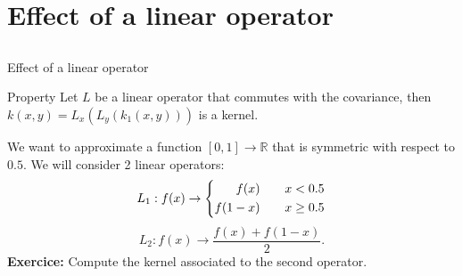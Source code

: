 \section[Linear operator]{Effect of a linear operator}
\subsection{}

\begin{frame}{Effect of a linear operator}
\begin{block}{Property}
Let $L$ be a linear operator that commutes with the covariance, then
$k(x,y) = L_x(L_y(k_1(x,y)))$ is a kernel.
\end{block}
\begin{example}
  We want to approximate a function $[0,1] \rightarrow \mathds{R}$ that is symmetric with respect to $0.5$.
We will consider 2 linear operators:
\begin{equation*}
 L_1 : f(x) \rightarrow
\left\{
\begin{aligned}
 f(x) \text{\qquad}  & x < 0.5 \\
 f(1-x) \text{\qquad}   & x \geq 0.5
\end{aligned}
\right.
\end{equation*}
$$ L_2 : f(x) \rightarrow \frac{f(x) + f(1-x)}{2}.$$
\textbf{Exercice:} Compute the kernel associated to the second operator.
\end{example}
\end{frame}

